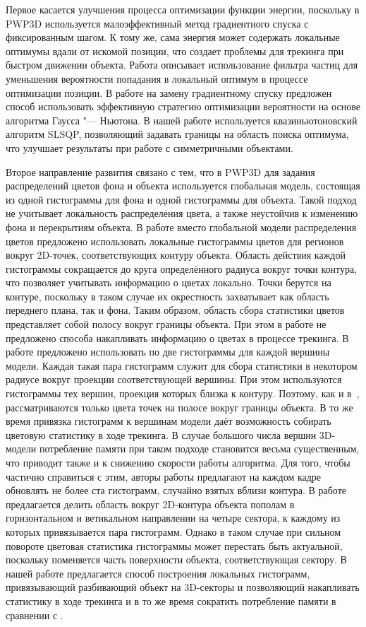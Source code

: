 Первое касается улучшения процесса оптимизации функции энергии, поскольку в
PWP3D используется малоэффективный метод градиентного спуска с фиксированным
шагом.
К тому же, сама энергия может содержать локальные оптимумы вдали от искомой
позиции, что создает проблемы для трекинга при быстром движении объекта.
Работа \cite{Zhao2014} описывает использование фильтра частиц для уменьшения
вероятности попадания в локальный оптимум в процессе оптимизации позиции.
В работе \cite{Tjaden2018} на замену градиентному спуску предложен способ
использовать эффективную стратегию оптимизации вероятности на основе алгоритма
Гаусса "--- Ньютона.
В нашей работе используется квазиньютоновский алгоритм SLSQP, позволяющий
задавать границы на область поиска оптимума, что улучшает результаты при работе
с симметричными объектами.

Второе направление развития связано с тем, что в PWP3D для задания
распределений цветов фона и объекта используется глобальная модель, состоящая
из одной гистограммы для фона и одной гистограммы для объекта.
Такой подход не учитывает локальность распределения цвета, а также неустойчив к
изменению фона и перекрытиям объекта.
В работе \cite{Hexner2016} вместо глобальной модели распределения цветов
предложено использовать локальные гистограммы цветов для регионов вокруг
2D-точек, соответствующих контуру объекта.
Область действия каждой гистограммы сокращается до круга
определённого радиуса вокруг точки контура, что позволяет учитывать информацию
о цветах локально.
Точки берутся на контуре, поскольку в таком случае их окрестность захватывает
как область переднего плана, так и фона.
Таким образом, область сбора статистики цветов представляет собой полосу вокруг
границы объекта.
При этом в работе \cite{Hexner2016} не предложено способа накапливать
информацию о цветах в процессе трекинга.
В работе \cite{Tjaden2017} предложено использовать по две гистограммы для
каждой вершины модели.
Каждая такая пара гистограмм служит для сбора статистики в некотором радиусе
вокруг проекции соответствующей вершины.
При этом используются гистограммы тех вершин, проекция которых близка к
контуру.
Поэтому, как и в~\cite{Hexner2016}, рассматриваются только цвета точек на
полосе вокруг границы объекта.
В то же время привязка гистограмм к вершинам модели даёт возможность собирать
цветовую статистику в ходе трекинга.
В случае большого числа вершин 3D-модели потребление памяти при таком подходе
становится весьма существенным, что приводит также и к снижению скорости работы
алгоритма.
Для того, чтобы частично справиться с этим, авторы работы \cite{Tjaden2017}
предлагают на каждом кадре обновлять не более ста гистограмм, случайно взятых
вблизи контура.
В работе \cite{Zhong2018} предлагается делить  область вокруг 2D-контура
объекта пополам в горизонтальном и ветикальном направлении на четыре сектора,
к каждому из которых привязывается пара гистограмм.
Однако в таком случае при сильном повороте цветовая статистика гистограммы
может перестать быть актуальной, поскольку поменяется часть поверхности
объекта, соответствующая сектору.
В нашей работе предлагается способ построения локальных гистограмм,
привязывающий разбивающий объект на 3D-секторы и позволяющий накапливать
статистику в ходе трекинга и в то же время сократить потребление памяти в
сравнении с \cite{Tjaden2017}.

